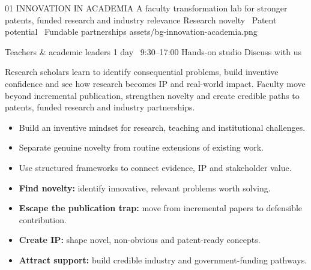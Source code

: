 \WorkshopHeader
  {01}
  {INNOVATION IN ACADEMIA}
  {A faculty transformation lab for stronger patents, funded research and industry relevance}
  {Research novelty \textbullet\ Patent potential \textbullet\ Fundable partnerships}
  {\faLightbulb}
  {assets/bg-innovation-academia.png}

\MetaStrip
  {Teachers \& academic leaders}
  {1 day \textbar\ 9:30--17:00}
  {Hands-on studio}
  {Discuss with us}

\begin{minipage}[t]{0.615\textwidth}
  \vspace{0pt}
  \begin{brochurecard}[colback=Accent!3!white]
    \WhyItMatters
      {Research scholars learn to identify consequential problems, build inventive confidence and see how research becomes IP and real-world impact.}
      {Faculty move beyond incremental publication, strengthen novelty and create credible paths to patents, funded research and industry partnerships.}
  \end{brochurecard}

  \begin{brochurecard}
    \begin{minipage}[t]{0.485\linewidth}
      \begin{itemize}
        \item Build an inventive mindset for research, teaching and institutional challenges.
        \item Separate genuine novelty from routine extensions of existing work.
        \item Use structured frameworks to connect evidence, IP and stakeholder value.
      \end{itemize}
    \end{minipage}\hfill
    \begin{minipage}[t]{0.485\linewidth}
      \begin{itemize}
        \item \textbf{Find novelty:} identify innovative, relevant problems worth solving.
        \item \textbf{Escape the publication trap:} move from incremental papers to defensible contribution.
        \item \textbf{Create IP:} shape novel, non-obvious and patent-ready concepts.
        \item \textbf{Attract support:} build credible industry and government-funding pathways.
      \end{itemize}
    \end{minipage}
  \end{brochurecard}


\end{minipage}
